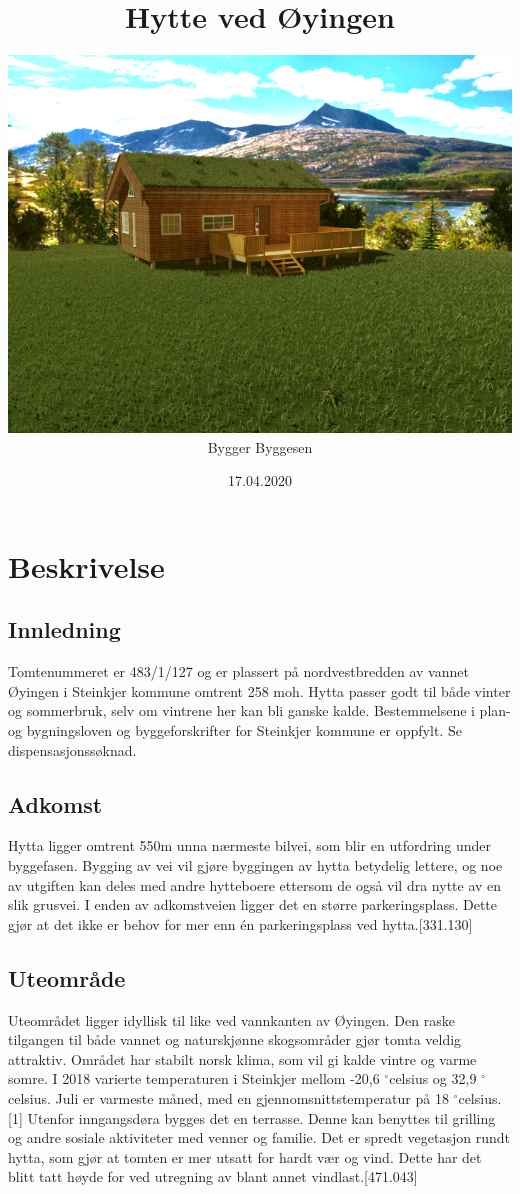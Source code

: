 \documentclass[12pt]{article}
\author{\includegraphics[scale=0.5]{Utside}\\Bygger Byggesen}
\title{Hytte ved Øyingen}
\date{17.04.2020}
\begin{document}
\begin{titlingpage}
\maketitle
\end{titlingpage}

\thispagestyle{empty}
\pagebreak
\tableofcontents
\thispagestyle{empty}
\pagebreak
\clearpage
{}

 
\section{Beskrivelse}
\subsection{Innledning}
Tomtenummeret er 483/1/127 og er plassert på nordvestbredden av vannet Øyingen i Steinkjer kommune omtrent 258 moh. Hytta passer godt til både vinter og sommerbruk, selv om vintrene her kan bli ganske kalde. Bestemmelsene i plan- og bygningsloven og byggeforskrifter for Steinkjer kommune er oppfylt. Se dispensasjonssøknad.


\subsection{Adkomst}
Hytta ligger omtrent 550m unna nærmeste bilvei, som blir en utfordring under byggefasen. Bygging av vei vil gjøre byggingen av hytta betydelig lettere, og noe av utgiften kan deles med andre hytteboere ettersom de også vil dra nytte av en slik grusvei. I enden av adkomstveien ligger det en større parkeringsplass. Dette gjør at det ikke er behov for mer enn én parkeringsplass ved hytta.[331.130]


\subsection{Uteområde}
Uteområdet ligger idyllisk til like ved vannkanten av Øyingen. Den raske tilgangen til både vannet og naturskjønne skogsområder gjør tomta veldig attraktiv. Området har stabilt norsk klima, som vil gi kalde vintre og varme somre. I 2018 varierte temperaturen i Steinkjer mellom -20,6 $^\circ$celsius og 32,9 $^\circ$celsius. Juli er varmeste måned, med en gjennomsnittstemperatur på 18 $^\circ$celsius.[1] Utenfor inngangsdøra bygges det en terrasse. Denne kan benyttes til grilling og andre sosiale aktiviteter med venner og familie.
Det er spredt vegetasjon rundt hytta, som gjør at tomten er mer utsatt for hardt vær og vind. Dette har det blitt tatt høyde for ved utregning av blant annet vindlast.[471.043]
\end{document}
